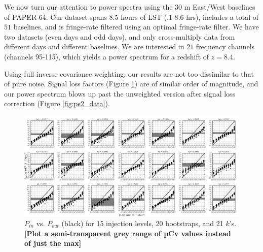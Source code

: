 \documentclass[preprint2,numberedappendix,tighten,twocolappendix]{aastex6}  %
\newcommand{\cc}[1]{{\color{purple} \textbf{[#1]}}}
\begin{document}
We now turn our attention to power spectra using the 30 m East/West baselines of PAPER-64. Our dataset spans $8.5$ hours of LST ($.1$-$8.6$ hrs), includes a total of $51$ baselines, and is fringe-rate filtered using an optimal fringe-rate filter. We have two datasets (even days and odd days), and only cross-multiply data from different days and different baselines. We are interested in $21$ frequency channels (channels 95-115), which yields a power spectrum for a redshift of $z=8.4$. 

Using full inverse covariance weighting, our results are not too dissimilar to that of pure noise. Signal loss factors (Figure \ref{fig:sigloss2_data}) are of similar order of magnitude, and our power spectrum blows up past the unweighted version after signal loss correction (Figure \ref{fig:ps2_data}).


\begin{figure}
	\centering
	\includegraphics[width=1.0\textwidth]{plots/sigloss2_data.png}
	\caption{$P_{in}$ vs. $P_{out}$ (black) for 15 injection levels, 20 bootstraps, and 21 $k$'s. \cc{Plot a semi-transparent grey range of pCv values instead of just the max}}
	\label{fig:sigloss2_data}
\end{figure}
\end{document}

